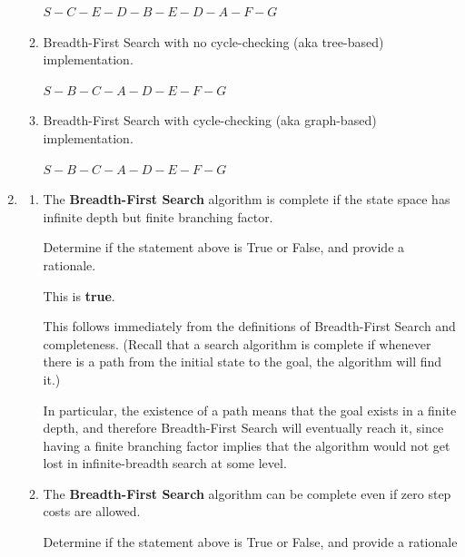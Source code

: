 \begin{enumerate}
\begin{enumerate}
        \begin{solution}
            $S - C - E - D - B - E - D - A - F - G$
        \end{solution}

        \item Breadth-First Search with no cycle-checking (aka tree-based) implementation.

        \begin{solution}
            $S - B - C - A - D - E - F - G$
        \end{solution}

        \item Breadth-First Search with cycle-checking (aka graph-based) implementation.

        \begin{solution}
            $S - B - C - A - D - E - F - G$
        \end{solution}
    \end{enumerate}

    \item \begin{enumerate}
        \item The \textbf{Breadth-First Search} algorithm is complete if the state space has infinite depth but finite branching factor.
        
        Determine if the statement above is True or False, and provide a rationale.

        \begin{solution}
            This is \textbf{true}. 
            
            This follows immediately from the definitions of Breadth-First Search and completeness. (Recall that a search algorithm is complete if whenever there is a path from the initial state to the goal, the algorithm will find it.) 
            
            In particular, the existence of a path means that the goal exists in a finite depth, and therefore Breadth-First Search will eventually reach it, since having a finite branching factor implies that the algorithm would not get lost in infinite-breadth search at some level.
        \end{solution}

        \item The \textbf{Breadth-First Search} algorithm can be complete even if zero step costs are allowed.

        Determine if the statement above is True or False, and provide a rationale


\end{enumerate}
\end{enumerate}
